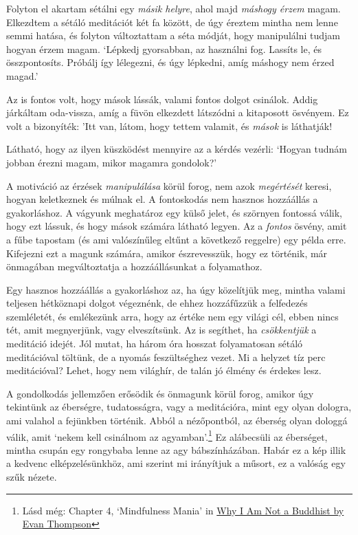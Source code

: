 Folyton el akartam sétálni egy \emph{másik helyre}, ahol majd
\emph{máshogy érzem} magam. Elkezdtem a sétáló meditációt két fa között,
de úgy éreztem mintha nem lenne semmi hatása, és folyton változtattam a
séta módját, hogy manipulálni tudjam hogyan érzem magam. `Lépkedj
gyorsabban, az használni fog. Lassíts le, és összpontosíts. Próbálj így
lélegezni, és úgy lépkedni, amíg máshogy nem érzed magad.'

Az is fontos volt, hogy mások lássák, valami fontos dolgot csinálok.
Addig járkáltam oda-vissza, amíg a füvön elkezdett látszódni a
kitaposott ösvényem. Ez volt a bizonyíték: 'Itt van, látom, hogy tettem
valamit, és \emph{mások} is láthatják!

Látható, hogy az ilyen küszködést mennyire az a kérdés vezérli: `Hogyan
tudnám jobban érezni magam, mikor magamra gondolok?'

A motiváció az érzések \emph{manipulálása} körül forog, nem azok
\emph{megértését} keresi, hogyan keletkeznek és múlnak el. A fontoskodás
nem hasznos hozzáállás a gyakorláshoz. A vágyunk meghatároz egy külső
jelet, és szörnyen fontossá válik, hogy ezt lássuk, és hogy mások
számára látható legyen. Az a \emph{fontos} ösvény, amit a fűbe tapostam
(és ami valószínűleg eltűnt a következő reggelre) egy példa erre.
Kifejezni ezt a magunk számára, amikor észrevesszük, hogy ez történik,
már önmagában megváltoztatja a hozzáállásunkat a folyamathoz.

Egy hasznos hozzáállás a gyakorláshoz az, ha úgy közelítjük meg, mintha
valami teljesen hétköznapi dolgot végeznénk, de ehhez hozzáfűzzük a
felfedezés szemléletét, és emlékezünk arra, hogy az értéke nem egy
világi cél, ebben nincs tét, amit megnyerjünk, vagy elveszítsünk. Az is
segíthet, ha \emph{csökkentjük} a meditáció idejét. Jól mutat, ha három
óra hosszat folyamatosan sétáló meditációval töltünk, de a nyomás
feszültséghez vezet. Mi a helyzet tíz perc meditációval? Lehet, hogy nem
világhír, de talán jó élmény és érdekes lesz.


A gondolkodás jellemzően erősödik és önmagunk körül forog, amikor úgy
tekintünk az éberségre, tudatosságra, vagy a meditációra, mint egy olyan
dologra, ami valahol a fejünkben történik. Abból a nézőpontból, az
éberség olyan dologgá válik, amit `nekem kell csinálnom az
agyamban'.\footnote{Lásd még: Chapter 4, `Mindfulness Mania' in
  \href{https://www.goodreads.com/book/show/44439993-why-i-am-not-a-buddhist}{Why
  I Am Not a Buddhist by Evan Thompson}} Ez alábecsüli az éberséget,
mintha csupán egy rongybaba lenne az agy bábszínházában. Habár ez a kép
illik a kedvenc elképzelésünkhöz, ami szerint mi irányítjuk a műsort, ez
a valóság egy szűk nézete.

